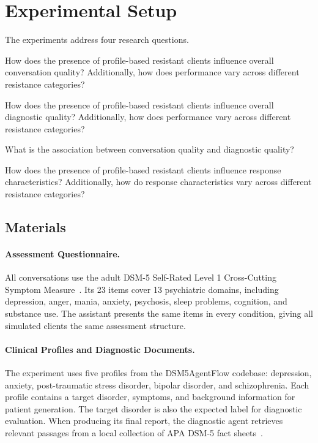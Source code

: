 \section{Experimental Setup}\label{s:experimental-setup}

The experiments address four research questions.

How does the presence of profile-based resistant clients influence overall conversation quality? Additionally, how does performance vary across different resistance categories?

How does the presence of profile-based resistant clients influence overall diagnostic quality? Additionally, how does performance vary across different resistance categories?

What is the association between conversation quality and diagnostic quality?

How does the presence of profile-based resistant clients influence response characteristics? Additionally, how do response characteristics vary across different resistance categories?

\subsection{Materials}

\paragraph{Assessment Questionnaire.}
All conversations use the adult DSM-5 Self-Rated Level 1 Cross-Cutting Symptom Measure~\cite{apa2013level1}. Its 23 items cover 13 psychiatric domains, including depression, anger, mania, anxiety, psychosis, sleep problems, cognition, and substance use. The assistant presents the same items in every condition, giving all simulated clients the same assessment structure.

\paragraph{Clinical Profiles and Diagnostic Documents.}
The experiment uses five profiles from the DSM5AgentFlow codebase: depression, anxiety, post-traumatic stress disorder, bipolar disorder, and schizophrenia. Each profile contains a target disorder, symptoms, and background information for patient generation. The target disorder is also the expected label for diagnostic evaluation. When producing its final report, the diagnostic agent retrieves relevant passages from a local collection of APA DSM-5 fact sheets~\cite{apadsmfactsheets}.

